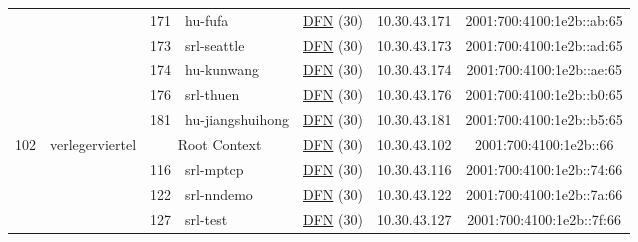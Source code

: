 \begin{small}
\begin{center}
\begin{longtable}{|c|c|c|c|c|c|c|c|}
  &  & \tiny{171} & \multicolumn{1}{|l|}{\tiny{hu-fufa}} & \multicolumn{2}{|c|}{\tiny{\href{https://www.dfn.de}{DFN} (30)}} & \tiny{10.30.43.171} & \tiny{2001:700:4100:1e2b::ab:65} \\* \cline{3-3}\cline{4-4}\cline{5-5}\cline{6-6}\cline{7-7}\cline{8-8}
  &  & \tiny{173} & \multicolumn{1}{|l|}{\tiny{srl-seattle}} & \multicolumn{2}{|c|}{\tiny{\href{https://www.dfn.de}{DFN} (30)}} & \tiny{10.30.43.173} & \tiny{2001:700:4100:1e2b::ad:65} \\* \cline{3-3}\cline{4-4}\cline{5-5}\cline{6-6}\cline{7-7}\cline{8-8}
  &  & \tiny{174} & \multicolumn{1}{|l|}{\tiny{hu-kunwang}} & \multicolumn{2}{|c|}{\tiny{\href{https://www.dfn.de}{DFN} (30)}} & \tiny{10.30.43.174} & \tiny{2001:700:4100:1e2b::ae:65} \\* \cline{3-3}\cline{4-4}\cline{5-5}\cline{6-6}\cline{7-7}\cline{8-8}
  &  & \tiny{176} & \multicolumn{1}{|l|}{\tiny{srl-thuen}} & \multicolumn{2}{|c|}{\tiny{\href{https://www.dfn.de}{DFN} (30)}} & \tiny{10.30.43.176} & \tiny{2001:700:4100:1e2b::b0:65} \\* \cline{3-3}\cline{4-4}\cline{5-5}\cline{6-6}\cline{7-7}\cline{8-8}
  &  & \tiny{181} & \multicolumn{1}{|l|}{\tiny{hu-jiangshuihong}} & \multicolumn{2}{|c|}{\tiny{\href{https://www.dfn.de}{DFN} (30)}} & \tiny{10.30.43.181} & \tiny{2001:700:4100:1e2b::b5:65} \\ \hline
 \multirow{17}{*}{\tiny{102}} & \multicolumn{1}{|l|}{\multirow{17}{*}{\tiny{verlegerviertel}}} & \multicolumn{2}{|c|}{\tiny{Root Context}} & \multicolumn{2}{|c|}{\tiny{\href{https://www.dfn.de}{DFN} (30)}} & \tiny{10.30.43.102} & \tiny{2001:700:4100:1e2b::66} \\* \cline{3-3}\cline{4-4}\cline{5-5}\cline{6-6}\cline{7-7}\cline{8-8}
  &  & \tiny{116} & \multicolumn{1}{|l|}{\tiny{srl-mptcp}} & \multicolumn{2}{|c|}{\tiny{\href{https://www.dfn.de}{DFN} (30)}} & \tiny{10.30.43.116} & \tiny{2001:700:4100:1e2b::74:66} \\* \cline{3-3}\cline{4-4}\cline{5-5}\cline{6-6}\cline{7-7}\cline{8-8}
  &  & \tiny{122} & \multicolumn{1}{|l|}{\tiny{srl-nndemo}} & \multicolumn{2}{|c|}{\tiny{\href{https://www.dfn.de}{DFN} (30)}} & \tiny{10.30.43.122} & \tiny{2001:700:4100:1e2b::7a:66} \\* \cline{3-3}\cline{4-4}\cline{5-5}\cline{6-6}\cline{7-7}\cline{8-8}
  &  & \tiny{127} & \multicolumn{1}{|l|}{\tiny{srl-test}} & \multicolumn{2}{|c|}{\tiny{\href{https://www.dfn.de}{DFN} (30)}} & \tiny{10.30.43.127} & \tiny{2001:700:4100:1e2b::7f:66} \\* \cline{3-3}\cline{4-4}\cline{5-5}\cline{6-6}\cline{7-7}\cline{8-8}

\end{longtable}
\end{center}
\end{small}
